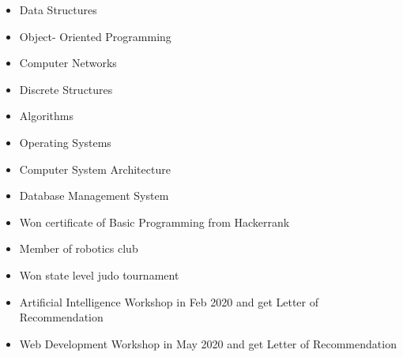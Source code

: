 













\medskip
{}

\begin{itemize}
    \item Data Structures
    \item Object- Oriented Programming
    \item Computer Networks
    \item Discrete Structures
    \item Algorithms %
    \item Operating Systems
    \item Computer System Architecture
    \item Database Management System
\end{itemize}

\begin{itemize}
    \item Won certificate of Basic Programming from Hackerrank
    \item Member of robotics club
    \item Won state level judo tournament
\end{itemize}
\smallskip
\begin{itemize}
\item  Artificial Intelligence Workshop in Feb 2020 and get Letter of Recommendation

\item Web Development Workshop in May 2020  and get Letter of Recommendation

\end{itemize}
